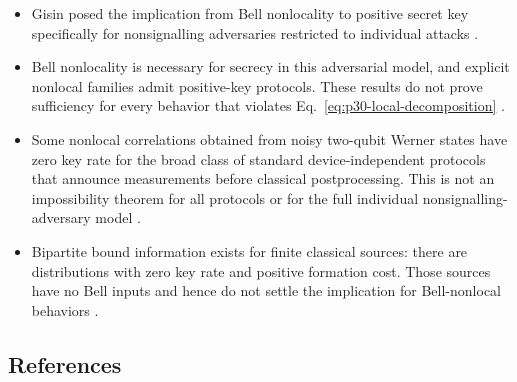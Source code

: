 \begin{itemize}
  \item Gisin posed the implication from Bell nonlocality to positive secret
  key specifically for nonsignalling adversaries restricted to individual
  attacks .

  \item Bell nonlocality is necessary for secrecy in this adversarial model,
  and explicit nonlocal families admit positive-key protocols.  These results
  do not prove sufficiency for every behavior that violates
  Eq.~\eqref{eq:p30-local-decomposition}
  .

  \item Some nonlocal correlations obtained from noisy two-qubit Werner
  states have zero key rate for the broad class of standard
  device-independent protocols that announce measurements before classical
  postprocessing.  This is not an impossibility theorem for all protocols or
  for the full individual nonsignalling-adversary model
  .

  \item Bipartite bound information exists for finite classical sources:
  there are distributions with zero key rate and positive formation cost.
  Those sources have no Bell inputs and hence do not settle the implication
  for Bell-nonlocal behaviors .
\end{itemize}

\subsection*{References}

